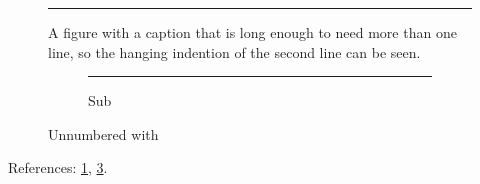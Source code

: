 \documentclass{article}
\begin{document}
\listoffigures

\begin{figure}[h]
  \centering
  \rule{4cm}{1cm}
  \caption{A figure with a caption that is long enough to need more than one line,
    so the hanging indention of the second line can be seen.}
  \label{fig:a}
\end{figure}

\begin{figure}[h]
  \centering
  \begin{subfigure}{.4\linewidth}
    \centering
    \rule{2cm}{1cm}
    \caption{Sub}
    \label{sub:a}
  \end{subfigure}
  \caption*{Unnumbered with }
\end{figure}

References: \ref{fig:a}, \ref{sub:a}.
\end{document}
